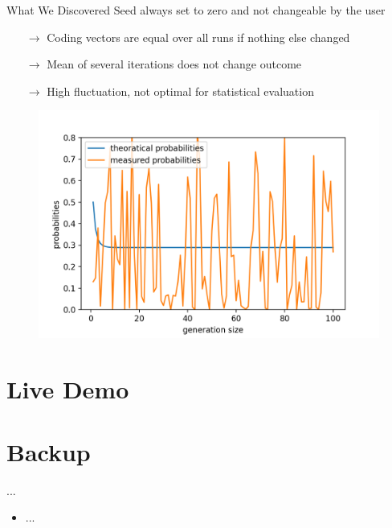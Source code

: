 \documentclass[t]{beamer} %
\begin{document}
\begin{frame}{What We Discovered}
	Seed always set to zero and not changeable by the user
	\begin{itemize}
		\item[$\rightarrow$] Coding vectors are equal over all runs if nothing else changed
		\item[$\rightarrow$] Mean of several iterations does not change outcome
		\item[$\rightarrow$] High fluctuation, not optimal for statistical evaluation
	\end{itemize}
	\begin{figure}[htb]
		\centering
		\includegraphics[scale=0.45]{figures/gf2_noseed}
	\end{figure}
\end{frame}




\section{Live Demo}



\appendix
{}
\section{Backup}
\begin{frame}{...}
	\begin{itemize}
		\item ...
	\end{itemize}
\end{frame}
\end{document}
